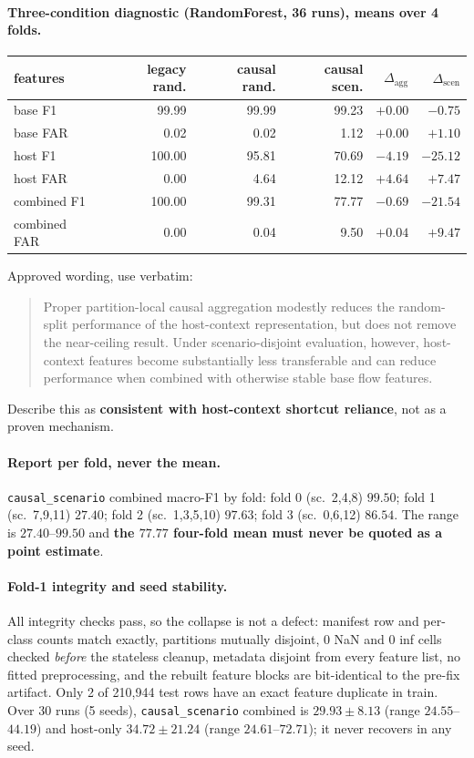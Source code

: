 \paragraph{Three-condition diagnostic (RandomForest, 36 runs), means over 4 folds.}
\begin{center}\small
\begin{tabular}{lrrrrr}\toprule
features & legacy rand. & causal rand. & causal scen. & $\Delta_{\mathrm{agg}}$ &
$\Delta_{\mathrm{scen}}$ \\\midrule
base F1      & 99.99 & 99.99 & 99.23 & $+0.00$ & $-0.75$ \\
base FAR     &  0.02 &  0.02 &  1.12 & $+0.00$ & $+1.10$ \\
host F1      & 100.00 & 95.81 & 70.69 & $-4.19$ & $-25.12$ \\
host FAR     &  0.00 &  4.64 & 12.12 & $+4.64$ & $+7.47$ \\
combined F1  & 100.00 & 99.31 & 77.77 & $-0.69$ & $-21.54$ \\
combined FAR &  0.00 &  0.04 &  9.50 & $+0.04$ & $+9.47$ \\
\bottomrule\end{tabular}\end{center}

\noindent Approved wording, use verbatim:
\begin{quote}
Proper partition-local causal aggregation modestly reduces the random-split performance
of the host-context representation, but does not remove the near-ceiling result. Under
scenario-disjoint evaluation, however, host-context features become substantially less
transferable and can reduce performance when combined with otherwise stable base flow
features.
\end{quote}
Describe this as \textbf{consistent with host-context shortcut reliance}, not as a proven
mechanism.

\paragraph{$\!$Report per fold, never the mean.} \texttt{causal\_scenario} combined
macro-F1 by fold: fold 0 (sc.\ 2,4,8) $99.50$; fold 1 (sc.\ 7,9,11) $\mathbf{27.40}$;
fold 2 (sc.\ 1,3,5,10) $97.63$; fold 3 (sc.\ 0,6,12) $86.54$. The range is
$27.40$--$99.50$ and \textbf{the $77.77$ four-fold mean must never be quoted as a point
estimate}.

\paragraph{Fold-1 integrity and seed stability.} All integrity checks pass, so the
collapse is not a defect: manifest row and per-class counts match exactly, partitions
mutually disjoint, 0 NaN and 0 inf cells checked \emph{before} the stateless cleanup,
metadata disjoint from every feature list, no fitted preprocessing, and the rebuilt
feature blocks are bit-identical to the pre-fix artifact. Only 2 of 210{,}944 test rows
have an exact feature duplicate in train. Over 30 runs (5 seeds), \texttt{causal\_scenario}
combined is $29.93 \pm 8.13$ (range $24.55$--$44.19$) and host-only $34.72 \pm 21.24$
(range $24.61$--$72.71$); it never recovers in any seed.


